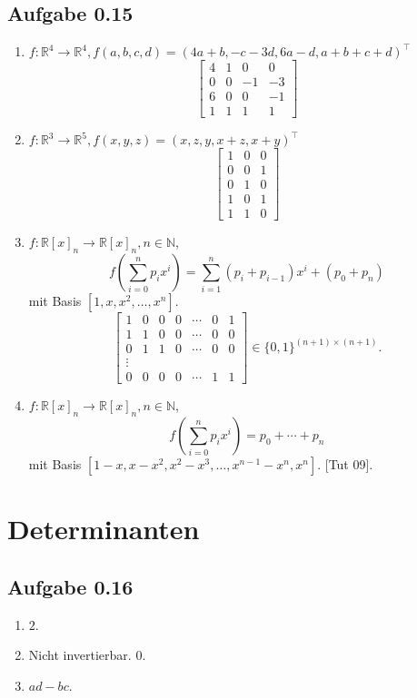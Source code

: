\subsection*{Aufgabe 0.15}
\begin{enumerate}
\item \(f: \mathbb{R}^{4} \to \mathbb{R}^{4}, f(a, b, c, d) = (4a+b, -c-3d, 6a-d,
  a+b+c+d)^{\top}\)
  \[
    \begin{bmatrix}
      4 & 1 & 0 & 0 \\
      0 & 0 & -1 & -3 \\
      6 & 0 & 0 & -1 \\
      1 & 1 & 1 & 1
    \end{bmatrix}
  \]
\item \(f\colon \mathbb{R}^{3} \to \mathbb{R}^{5}, f(x, y, z) = (x, z, y, x + z, x + y)^{\top}\)
  \[
    \begin{bmatrix}
      1 & 0 & 0 \\
      0 & 0 & 1 \\
      0 & 1 & 0 \\
      1 & 0 & 1 \\
      1 & 1 & 0
    \end{bmatrix}
  \]
\item \(f\colon \mathbb{R}[x]_{n} \to \mathbb{R}[x]_{n}, n \in \mathbb{N}\),
  \[f\left(\sum_{i = 0}^{n}{p_{i}x^{i}}\right) =
    \sum_{i=1}^{n}(p_{i}+p_{i-1})x^{i} + (p_{0} + p_{n})\]
  mit Basis \([1, x, x^{2}, \ldots, x^{n}]\).
  \[
    \begin{bmatrix}
      1 & 0 & 0 & 0 & \cdots & 0 & 1 \\
      1 & 1 & 0 & 0 & \cdots & 0 & 0 \\
      0 & 1 & 1 & 0 & \cdots & 0 & 0 \\
      \vdots \\
      0 & 0 & 0 & 0 & \cdots & 1 & 1
    \end{bmatrix}
    \in \{0, 1\}^{(n+1) \times (n+1)}.
  \]
\item \(f\colon \mathbb{R}[x]_{n} \to \mathbb{R}[x]_{n}, n \in \mathbb{N}\),
  \[f\left(\sum_{i=0}^{n}p_{i}x^{i}\right) = p_{0} + \cdots + p_{n}\]
  mit Basis \([1-x, x-x^{2}, x^{2} - x^{3}, \ldots, x^{n-1} - x^{n},
  x^{n}]\).
  [Tut 09].
\end{enumerate}
\section*{Determinanten}
\subsection*{Aufgabe 0.16}
\begin{enumerate}
\item \(2\).
\item Nicht invertierbar. \(0\).
\item \(ad-bc\).
\end{enumerate}
